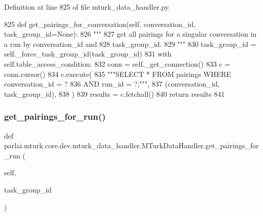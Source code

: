 Definition at line 825 of file mturk\+\_\+data\+\_\+handler.\+py.


\begin{DoxyCode}
825     \textcolor{keyword}{def }get\_pairings\_for\_conversation(self, conversation\_id, task\_group\_id=None):
826         \textcolor{stringliteral}{"""}
827 \textcolor{stringliteral}{        get all pairings for a singular conversation in a run by conversation\_id and}
828 \textcolor{stringliteral}{        task\_group\_id.}
829 \textcolor{stringliteral}{        """}
830         task\_group\_id = self.\_force\_task\_group\_id(task\_group\_id)
831         with self.table\_access\_condition:
832             conn = self.\_get\_connection()
833             c = conn.cursor()
834             c.execute(
835                 \textcolor{stringliteral}{"""SELECT * FROM pairings WHERE conversation\_id = ?}
836 \textcolor{stringliteral}{                         AND run\_id = ?;"""},
837                 (conversation\_id, task\_group\_id),
838             )
839             results = c.fetchall()
840             \textcolor{keywordflow}{return} results
841 
\end{DoxyCode}
\mbox{\label{classparlai_1_1mturk_1_1core_1_1dev_1_1mturk__data__handler_1_1MTurkDataHandler_aac09cee0791b834add5a50e430b6030e}} 
\subsubsection{\texorpdfstring{get\+\_\+pairings\+\_\+for\+\_\+run()}{get\_pairings\_for\_run()}}
{\footnotesize\ttfamily def parlai.\+mturk.\+core.\+dev.\+mturk\+\_\+data\+\_\+handler.\+M\+Turk\+Data\+Handler.\+get\+\_\+pairings\+\_\+for\+\_\+run (\begin{DoxyParamCaption}\item[{}]{self,  }\item[{}]{task\+\_\+group\+\_\+id }\end{DoxyParamCaption})}

